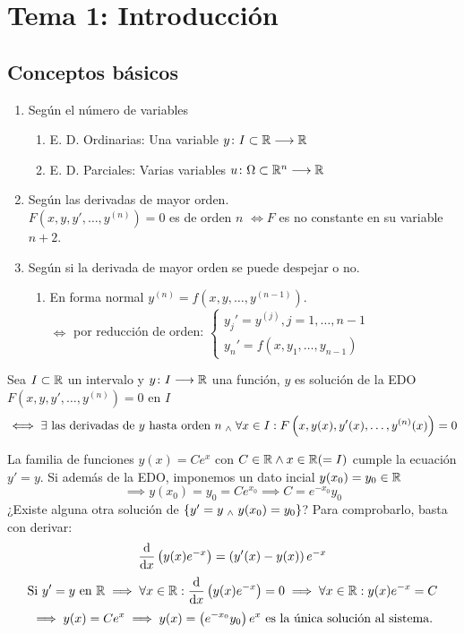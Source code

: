 \section{Tema 1: Introducción}
\subsection{Conceptos básicos}
\begin{defn}
	\item[] 
	\begin{enumerate}[topsep=1pt, itemsep=1pt,parsep=3pt]
		\item Según el número de variables
		\begin{enumerate}[topsep=1pt, itemsep=1pt,parsep=3pt]
			\item E. D. Ordinarias: Una variable $y \colon I\subset \mathbb{R} \longrightarrow \mathbb{R}$
			\item E. D. Parciales: Varias variables $u \colon \Omega \subset \mathbb{R}^{n} \longrightarrow \mathbb{R}$
		\end{enumerate}
		\item Según las derivadas de mayor orden. \\$F\left(x,y,y', \dots, y^{(n)}\right)=0$ es de orden $n$ \(\iff F\) es no constante en su variable $n+2$.
		\item Según si la derivada de mayor orden se puede despejar o no.
		\begin{enumerate}[topsep=1pt, itemsep=1pt,parsep=3pt]
			\item En forma normal $y^{(n)} = f(x, y, \dots, y^{(n-1)})$.
			\\ $\iff$ por reducción de orden:
			$\begin{cases}
				y_j' = y^{(j)}, j=1, \dots, n-1\\
				y_n'=f(x,y_1, \dots, y_{n-1})
			\end{cases}$
		\end{enumerate}
	\end{enumerate}    
\end{defn}
\begin{defn}
	Sea $I\subset \mathbb{R}$ un intervalo y $y \colon I \longrightarrow \mathbb{R}$ una función, $y$ es solución de la EDO $F\left(x,y,y', \dots, y^{(n)}\right)=0$ en $I$
	\[\iff \exists \text{ las derivadas de } y \text{ hasta orden } n \; _{\wedge} \; \forall x \in I : F\left(x,y(x),y'(x), \dots, y^{(n)}(x)\right)=0\]
\end{defn}
\begin{ejem}
	La familia de funciones $y(x)=Ce^x$ con $C\in \mathbb{R} \wedge x\in \mathbb{R} (=I)$ cumple la ecuación $y'=y$. Si además de la EDO, imponemos un dato incial $y(x_0)=y_0 \in \mathbb{R}$
	\[\implies y(x_0)=y_0=Ce^{x_0} \implies C=e^{-x_0}y_0\]
	¿Existe alguna otra solución de $\{y'=y \; _{\wedge} \; y(x_0)=y_0\}$?
	Para comprobarlo, basta con derivar:
	\[\odv{}{x}\left(y(x)e^{-x}\right)=\left(y'(x) - y(x)\right)e^{-x}\]
	\[\tex{Si } y'=y \tex{ en } \R \implies \forall x \in \R : \odv{}{x}\left(y(x)e^{-x}\right)=0 \implies \forall x \in \R : y(x)e^{-x} = C\]
	\[\implies y(x)=Ce^x \implies y(x)=\left(e^{-x_0}y_0\right)e^x \text{ es la única solución al sistema.}\]
\end{ejem}

